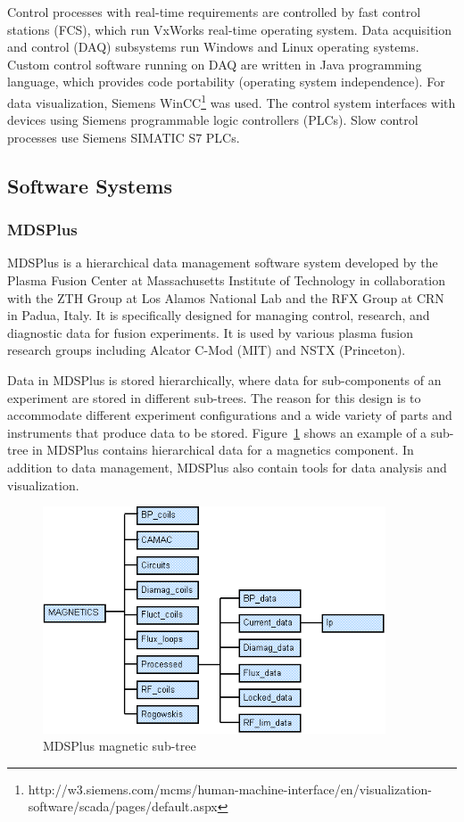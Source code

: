 Control processes with real-time requirements are controlled by fast control stations (FCS), which run VxWorks real-time operating system. Data acquisition and control (DAQ) subsystems run Windows and Linux operating systems. Custom control software running on DAQ are written in Java programming language, which provides code portability (operating system independence). For data visualization, Siemens WinCC\footnote{http://w3.siemens.com/mcms/human-machine-interface/en/visualization-software/scada/pages/default.aspx} was used. The control system interfaces with devices using Siemens programmable logic controllers (PLCs). Slow control processes use Siemens SIMATIC S7 PLCs.

\subsection{Software Systems}

\subsubsection{MDSPlus}

MDSPlus is a hierarchical data management software system developed by the Plasma Fusion Center at Massachusetts Institute of Technology in collaboration with the ZTH Group at Los Alamos National Lab and the RFX Group at CRN in Padua, Italy. It is specifically designed for managing control, research, and diagnostic data for fusion experiments. It is used by various plasma fusion research groups including Alcator C-Mod (MIT) and NSTX (Princeton).

Data in MDSPlus is stored hierarchically, where data for sub-components of an experiment are stored in different sub-trees. The reason for this design is to accommodate different experiment configurations and a wide variety of parts and instruments that produce data to be stored. Figure~\ref{tree-example} shows an example of a sub-tree in MDSPlus contains hierarchical data for a magnetics component. In addition to data management, MDSPlus also contain tools for data analysis and visualization.

\begin{figure}[h!]
\begin{center}
\includegraphics[width=4in]{figures/Tree-example.png}
\caption{MDSPlus magnetic sub-tree\label{tree-example}}
\end{center}
\end{figure}

